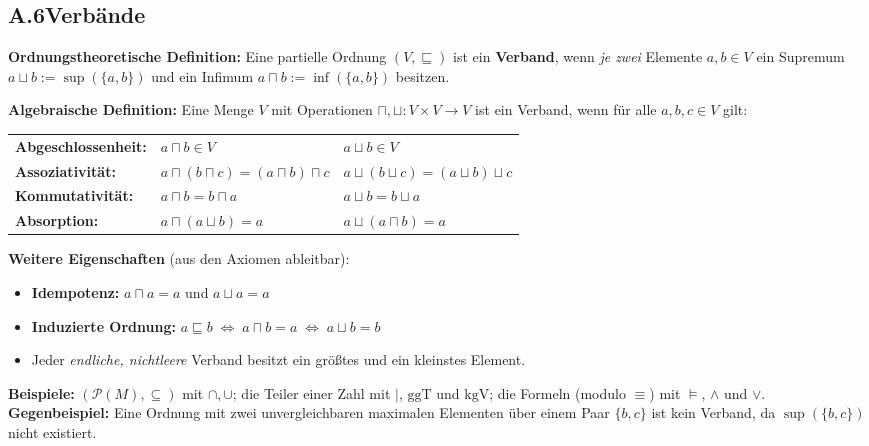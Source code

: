 \subsection*{A.6\quad Verbände}

\noindent\textbf{Ordnungstheoretische Definition:} Eine partielle Ordnung $(V,\sqsubseteq)$ ist ein \textbf{Verband}, wenn \emph{je zwei} Elemente $a,b \in V$ ein Supremum $a \sqcup b := \sup(\{a,b\})$ und ein Infimum $a \sqcap b := \inf(\{a,b\})$ besitzen.

\medskip
\noindent\textbf{Algebraische Definition:} Eine Menge $V$ mit Operationen $\sqcap, \sqcup : V \times V \to V$ ist ein Verband, wenn für alle $a,b,c \in V$ gilt:

\begin{center}
\renewcommand{\arraystretch}{1.4}
\begin{tabular}{l l l}
\textbf{Abgeschlossenheit:} & $a \sqcap b \in V$ & $a \sqcup b \in V$ \\
\textbf{Assoziativität:} & $a \sqcap (b \sqcap c) = (a \sqcap b) \sqcap c$ & $a \sqcup (b \sqcup c) = (a \sqcup b) \sqcup c$ \\
\textbf{Kommutativität:} & $a \sqcap b = b \sqcap a$ & $a \sqcup b = b \sqcup a$ \\
\textbf{Absorption:}     & $a \sqcap (a \sqcup b) = a$ & $a \sqcup (a \sqcap b) = a$ \\
\end{tabular}
\end{center}

\noindent\textbf{Weitere Eigenschaften} (aus den Axiomen ableitbar):
\begin{itemize}
  \item \textbf{Idempotenz:} $a \sqcap a = a$ und $a \sqcup a = a$
  \item \textbf{Induzierte Ordnung:} $a \sqsubseteq b \;\Longleftrightarrow\; a \sqcap b = a \;\Longleftrightarrow\; a \sqcup b = b$
  \item Jeder \emph{endliche, nichtleere} Verband besitzt ein größtes und ein kleinstes Element.
\end{itemize}

\noindent\textbf{Beispiele:} $(\mathcal{P}(M),\subseteq)$ mit $\cap,\cup$; die Teiler einer Zahl mit $\mid$, $\text{ggT}$ und $\text{kgV}$; die Formeln (modulo $\equiv$) mit $\models$, $\wedge$ und $\vee$. \\
\noindent\textbf{Gegenbeispiel:} Eine Ordnung mit zwei unvergleichbaren maximalen Elementen über einem Paar $\{b,c\}$ ist kein Verband, da $\sup(\{b,c\})$ nicht existiert.


